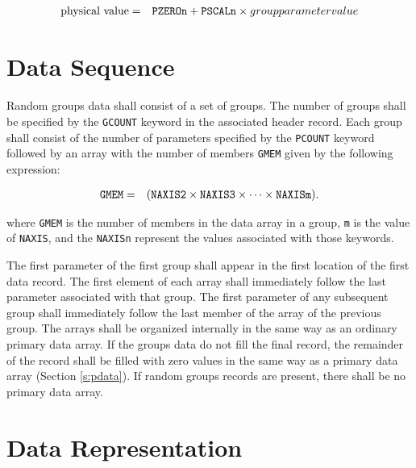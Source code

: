 \begin{eqnarray}  
    \mbox{physical value} & = & \mbox{{\tt PZEROn}} + \mbox{{\tt PSCALn}}
                                \times {group parameter value} \label{eq:pscl}
\end{eqnarray}  
  
\section{Data Sequence}
 \label{s:grdata}
  Random groups data shall consist of a set of groups.  The number of
  groups shall be specified by the {\tt GCOUNT} keyword in the associated
  header record.  Each group shall consist of the number
  of
  parameters specified by the {\tt PCOUNT} 
  keyword followed by an array with the number of 
  members {\tt GMEM} given 
  by the following
  expression:

\begin{eqnarray}  
   \mbox{{\tt GMEM}} &=&  
                     (\mbox{{\tt NAXIS2}} \times 
                 \mbox{{\tt NAXIS3}} \times  \cdots \times \mbox{{\tt
NAXISm}}).
\end{eqnarray}

\noindent
  where {\tt GMEM} is the number of members in the data array in a group,
  {\tt m} is the value of {\tt NAXIS}, 
  and the {\tt NAXISn} represent 
  the values associated with those keywords.

  The first parameter of the first group shall appear in the first
  location of the first data record.  The first element of each array shall
  immediately follow the last parameter associated with that group.
  The first parameter of any subsequent group shall immediately follow
  the last member of the array of the previous group.  The arrays shall
  be organized internally in the same way as an 
  ordinary primary data array. 
  If the groups data do not fill the final record, the remainder 
  of the record shall be filled with zero values in the same
  way as a primary data array (Section \ref{s:pdata}). 
If random groups records are present, there shall be no primary data 
  array.
  
\section{Data Representation}
  
